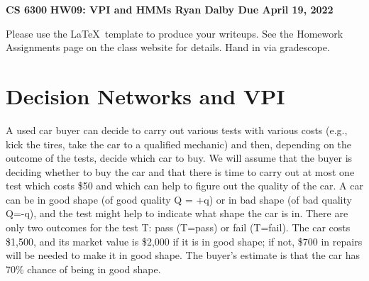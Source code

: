 \documentclass[12pt]{article}
\begin{document}
\begin{center}
{\bf CS 6300} \hfill {\large\bf HW09: VPI and HMMs \hfill {\bf Ryan Dalby} \hfill Due April 19, 2022}
\end{center}

\noindent
Please use the \LaTeX\ template to produce your writeups. See the
Homework Assignments page on the class website for details.  Hand in
via gradescope.

\section{Decision Networks and VPI}

A used car buyer can decide to carry out various tests with various
costs (e.g., kick the tires, take the car to a qualified mechanic) and
then, depending on the outcome of the tests, decide which car to buy.
We will assume that the buyer is deciding whether to buy the car and
that there is time to carry out at most one test which costs \$50 and
which can help to figure out the quality of the car.  A car can be in
good shape (of good quality Q = +q) or in bad shape (of bad quality
Q=-q), and the test might help to indicate what shape the car is in.
There are only two outcomes for the test T: pass (T=pass) or fail
(T=fail).  The car costs \$1,500, and its market value is \$2,000 if
it is in good shape; if not, \$700 in repairs will be needed to make
it in good shape.  The buyer's estimate is that the car has 70\%
chance of being in good shape.
\end{document}
